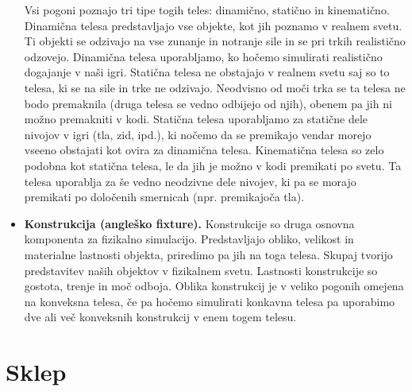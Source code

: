 \documentclass[12pt,a4paper,twoside]{book}
\begin{document}
\begin{itemize}
	Vsi pogoni poznajo tri tipe togih teles: dinamično, statično in kinematično. Dinamična telesa predstavljajo vse objekte, kot jih poznamo v realnem svetu. Ti objekti se odzivajo na vse zunanje in notranje sile in se pri trkih realistično odzovejo. Dinamična telesa uporabljamo, ko hočemo simulirati realistično dogajanje v naši igri. Statična telesa ne obstajajo v realnem svetu saj so to telesa, ki se na sile in trke ne odzivajo. Neodvisno od moči trka se ta telesa ne bodo premaknila (druga telesa se vedno odbijejo od njih), obenem pa jih ni možno premakniti v kodi. Statična telesa uporabljamo za statične dele nivojov v igri (tla, zid, ipd.), ki nočemo da se premikajo vendar morejo vseeno obstajati kot ovira za dinamična telesa. Kinematična telesa so zelo podobna kot statična telesa, le da jih je možno v kodi premikati po svetu. Ta telesa uporablja za še vedno neodzivne dele nivojev, ki pa se morajo premikati po določenih smernicah (npr. premikajoča tla).
	\item \textbf{Konstrukcija (angleško fixture).} Konstrukcije so druga osnovna komponenta za fizikalno simulacijo. Predstavljajo obliko, velikost in materialne lastnosti objekta, priredimo pa jih na toga telesa. Skupaj tvorijo predstavitev naših objektov v fizikalnem svetu. Lastnosti konstrukcije so gostota, trenje in moč odboja. Oblika konstrukcij je v veliko pogonih omejena na konveksna telesa, če pa hočemo simulirati konkavna telesa pa uporabimo dve ali več konveksnih konstrukcij v enem togem telesu.
\end{itemize}

\chapter{Sklep}\thispagestyle{fancy}

\cleardoublepage


\end{document}
